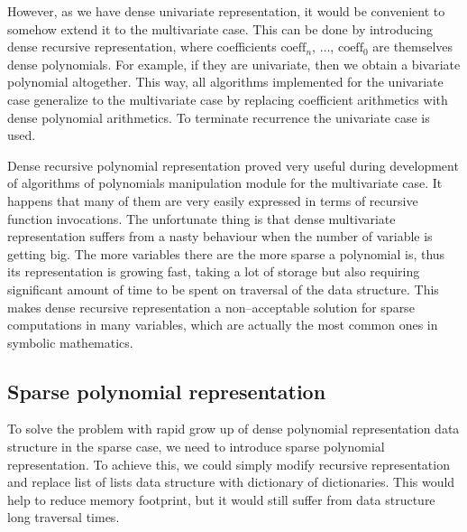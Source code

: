 However, as we have dense univariate representation, it would be convenient to somehow extend it
to the multivariate case. This can be done by introducing dense recursive representation, where
coefficients $\mbox{coeff}_n$, $\ldots$, $\mbox{coeff}_0$ are themselves dense polynomials. For
example, if they are univariate, then we obtain a bivariate polynomial altogether. This way, all
algorithms implemented for the univariate case generalize to the multivariate case by replacing
coefficient arithmetics with dense polynomial arithmetics. To terminate recurrence the univariate
case is used.

Dense recursive polynomial representation proved very useful during development of algorithms of
polynomials manipulation module for the multivariate case. It happens that many of them are very
easily expressed in terms of recursive function invocations. The unfortunate thing is that dense
multivariate representation suffers from a nasty behaviour when the number of variable is getting
big. The more variables there are the more sparse a polynomial is, thus its representation is
growing fast, taking a lot of storage but also requiring significant amount of time to be spent
on traversal of the data structure. This makes dense recursive representation a non--acceptable
solution for sparse computations in many variables, which are actually the most common ones in
symbolic mathematics.


\subsection{Sparse polynomial representation}

To solve the problem with rapid grow up of dense polynomial representation data structure in
the sparse case, we need to introduce sparse polynomial representation. To achieve this, we
could simply modify recursive representation and replace list of lists data structure with
dictionary of dictionaries. This would help to reduce memory footprint, but it would still
suffer from data structure long traversal times.

